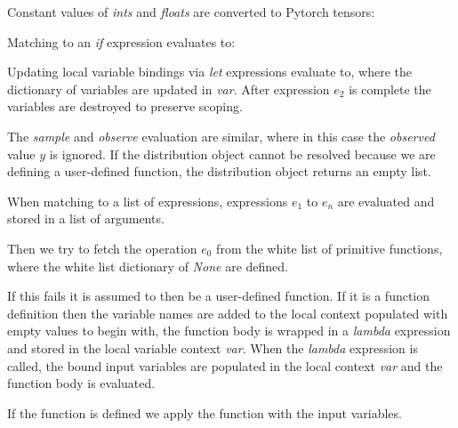 \documentclass[]{article}
\begin{document}
Constant values of \emph{ints} and \emph{floats} are converted to Pytorch tensors:



Matching to an \emph{if} expression evaluates to:



Updating local variable bindings via \emph{let} expressions evaluate to, where the dictionary of variables are updated in \emph{var}. After expression $e_2$ is complete the variables are destroyed to preserve scoping.



The \emph{sample} and \emph{observe} evaluation are similar, where in this case the \emph{observed} value $y$ is ignored. If the distribution object cannot be resolved because we are defining a user-defined function, the distribution object returns an empty list.



When matching to a list of expressions, expressions $e_1$ to $e_n$ are evaluated and stored in a list of arguments. 



Then we try to fetch the operation $e_0$ from the white list of primitive functions, where the white list dictionary of \emph{None} are defined.



If this fails it is assumed to then be a user-defined function. If it is a function definition then the variable names are added to the local context populated with empty values to begin with, the function body is wrapped in a \emph{lambda} expression and stored in the local variable context \emph{var}. When the \emph{lambda} expression is called, the bound input variables are populated in the local context \emph{var} and the function body is evaluated.

If the function is defined we apply the function with the input variables. 


\end{document}

